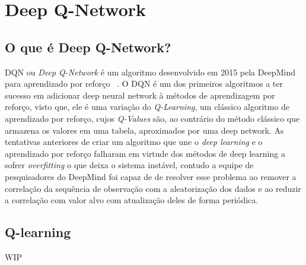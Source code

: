 

\chapter{Deep Q-Network}
\label{cap:dqn}

\section{O que é Deep Q-Network?}
\label{sec:o-que-e-dqn}

\enlargethispage{.5\baselineskip}
DQN ou \textit{Deep Q-Network} é um algoritmo desenvolvido em 2015 pela DeepMind para aprendizado por reforço ~\citep{Human-level-control}. O DQN é um dos primeiros algoritmos a ter sucesso em adicionar deep neural network à métodos de aprendizagem por reforço, visto que, ele é uma variação do \textit{Q-Learning}, um clássico algoritmo de aprendizado por reforço, cujos \textit{Q-Values} são, ao contrário do método clássico que armazena os valores em uma tabela, aproximados por uma deep network. As tentativas anteriores de criar um algoritmo que une o \textit{deep learning} e o aprendizado por reforço falharam em virtude dos métodos de deep learning a sofrer \textit{overfitting} o que deixa o sistema instável, contudo a equipe de pesquisadores do DeepMind foi capaz de de resolver esse problema ao remover a correlação da sequência de observação com a aleatorização dos dados e ao reduzir a correlação com valor alvo com atualização deles de forma periódica.

\section{Q-learning}
\label{sec:q-learning}

\enlargethispage{.5\baselineskip}
WIP
